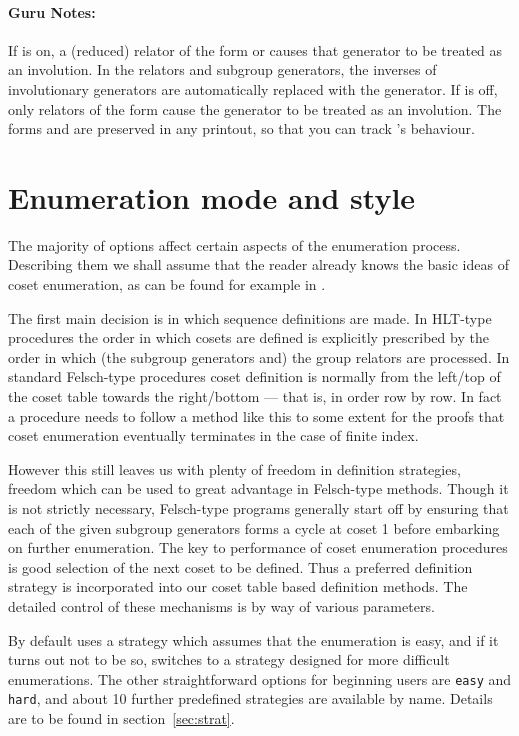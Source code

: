 \paragraph{Guru Notes:}
If  is on, a (reduced) relator of the form  or 
  causes that generator to be treated as an involution.
In the relators and subgroup generators, the inverses of involutionary
  generators are automatically replaced with the generator.
If  is off, only relators of the form  cause the
  generator to be treated as an involution.
The forms  and  are preserved in any printout, so
  that you can track \ace's behaviour.

\section{Enumeration mode and style}\label{sec:style}

The majority of options affect certain aspects of the enumeration process.
Describing them we shall assume that the reader already knows the basic
ideas of coset enumeration, as can be found for example in
\cite{Neu}.

The first main decision is in which sequence definitions are made.
In HLT-type procedures
the order in which cosets are defined is explicitly prescribed by the order
in which (the subgroup generators and) the group
relators are processed. In standard
Felsch-type procedures coset definition is normally from the left/top
of the coset table towards the right/bottom --- that is, in order row by row. 
In fact a procedure needs to follow a method like this to some extent for 
the proofs that coset enumeration eventually terminates in the case of 
finite index.

However this still leaves us with plenty of freedom in definition
strategies, freedom which can be used to great advantage in Felsch-type
methods. Though it is not strictly necessary, Felsch-type programs generally
start off by ensuring that each of the given subgroup generators
forms a cycle at coset 1 before embarking on further enumeration.
The key to performance of coset enumeration procedures is 
good selection of the  next coset to be defined. Thus a preferred
definition strategy is incorporated into our coset table based
definition methods. The detailed control of these mechanisms
is by way of various parameters.

By default {\ace} uses a strategy which assumes that the enumeration is
easy, and if it turns out not to be so, {\ace} switches to a strategy
designed for more difficult enumerations. The other straightforward
options for beginning users are {\tt easy} and {\tt hard}, and about 10
further predefined strategies are available by name. Details are
to be found in section~\ref{sec:strat}.

